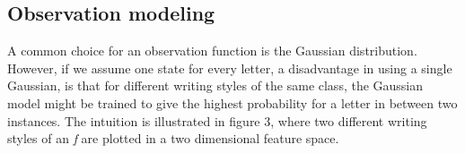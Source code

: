 \documentclass[conference]{IEEEtran}
\begin{document}
\subsection{Observation modeling}
A common choice for an observation function is the Gaussian distribution. However, if we assume one state for every letter, a disadvantage in using a single Gaussian, is that for different writing styles of the same class, the Gaussian model might be trained to give the highest probability for a letter in between two instances. The intuition is illustrated in figure 3, where two different writing styles of an {\it f} are plotted in a two dimensional feature space.
\begin{figure}[ht]
  \centering
\end{figure}
\end{document}

